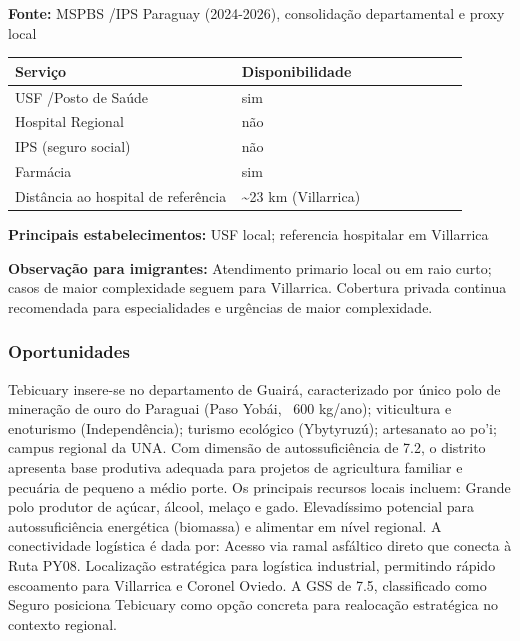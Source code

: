 \textbf{Fonte:} MSPBS /\allowbreak  IPS Paraguay (2024-2026), consolidação
departamental e proxy local

{\def\LTcaptype{none} %
\begin{longtable}{@{}>{\raggedright\arraybackslash}p{0.45\linewidth} >{\raggedright\arraybackslash}p{0.45\linewidth}@{}}
\toprule\noalign{}
Serviço & Disponibilidade \\
\midrule\noalign{}
\endhead
\bottomrule\noalign{}
\endlastfoot
USF /\allowbreak  Posto de Saúde & sim \\
Hospital Regional & não \\
IPS (seguro social) & não \\
Farmácia & sim \\
Distância ao hospital de referência & \textasciitilde23 km
(Villarrica) \\
\end{longtable}
}

\textbf{Principais estabelecimentos:} USF local; referencia hospitalar
em Villarrica

\textbf{Observação para imigrantes:} Atendimento primario local ou em
raio curto; casos de maior complexidade seguem para Villarrica.
Cobertura privada continua recomendada para especialidades e urgências
de maior complexidade.
\newpage

\subsubsection*{Oportunidades}\label{oport-tebicuary-0418}
Tebicuary insere-se no departamento de Guairá, caracterizado por único polo de mineração de ouro do Paraguai (Paso Yobái, ~600 kg/ano); viticultura e enoturismo (Independência); turismo ecológico (Ybytyruzú); artesanato ao po'i; campus regional da UNA. Com dimensão de autossuficiência de 7.2, o distrito apresenta base produtiva adequada para projetos de agricultura familiar e pecuária de pequeno a médio porte. Os principais recursos locais incluem: Grande polo produtor de açúcar, álcool, melaço e gado. Elevadíssimo potencial para autossuficiência energética (biomassa) e alimentar em nível regional. A conectividade logística é dada por: Acesso via ramal asfáltico direto que conecta à Ruta PY08. Localização estratégica para logística industrial, permitindo rápido escoamento para Villarrica e Coronel Oviedo. A GSS de 7.5, classificado como Seguro posiciona Tebicuary como opção concreta para realocação estratégica no contexto regional.

